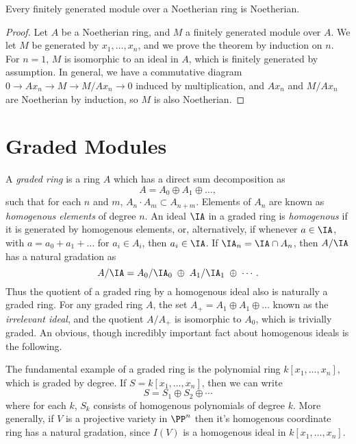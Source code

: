 \begin{theorem}
    Every finitely generated module over a Noetherian ring is Noetherian.
\end{theorem}
\begin{proof}
    Let $A$ be a Noetherian ring, and $M$ a finitely generated module over $A$. We let $M$ be generated by $x_1, \dots, x_n$, and we prove the theorem by induction on $n$. For $n = 1$, $M$ is isomorphic to an ideal in $A$, which is finitely generated by assumption. In general, we have a commutative diagram $0 \to Ax_n \to M \to M/Ax_n \to 0$ induced by multiplication, and $Ax_n$ and $M/Ax_n$ are Noetherian by induction, so $M$ is also Noetherian.
\end{proof}

\chapter{Graded Modules}

A \emph{graded ring} is a ring $A$ which has a direct sum decomposition as
%
\[ A = A_0 \oplus A_1 \oplus \dots, \]
%
such that for each $n$ and $m$, $A_n \cdot A_m \subset A_{n + m}$. Elements of $A_n$ are known as \emph{homogenous elements} of degree $n$. An ideal $\IA$ in a graded ring is \emph{homogenous} if it is generated by homogenous elements, or, alternatively, if whenever $a \in \IA$, with $a = a_0 + a_1 + \dots$ for $a_i \in A_i$, then $a_i \in \IA$. If $\IA_n = \IA \cap A_n$, then $A/\IA$ has a natural gradation as
%
\[ A/\IA = A_0/\IA_0\; \oplus\; A_1/\IA_1\; \oplus\; \cdots. \]
%
Thus the quotient of a graded ring by a homogenous ideal also is naturally a graded ring. For any graded ring $A$, the set $A_+ = A_1 \oplus A_1 \oplus \dots$ known as the \emph{irrelevant ideal}, and the quotient $A/A_+$ is isomorphic to $A_0$, which is trivially graded. An obvious, though incredibly important fact about homogenous ideals is the following.

\begin{example}
    The fundamental example of a graded ring is the polynomial ring $k[x_1, \dots, x_n]$, which is graded by degree. If $S = k[x_1,\dots,x_n]$, then we can write
    \[ S = S_1 \oplus S_2 \oplus \cdots \]
    where for each $k$, $S_k$ consists of homogenous polynomials of degree $k$. More generally, if $V$ is a projective variety in $\PP^n$ then it's homogenous coordinate ring has a natural gradation, since $I(V)$ is a homogenous ideal in $k[x_1,\dots,x_n]$.
\end{example}

